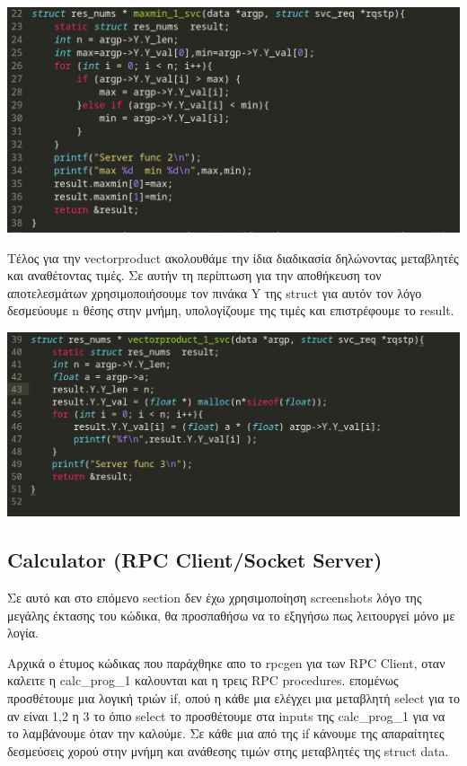 \begin{center}
			\includegraphics[width=1\textwidth]{image/maxmin.png}		
\end{center}
\noindent
Τέλος για την vectorproduct ακολουθάμε την ίδια διαδικασία  δηλώνοντας μεταβλητές και αναθέτοντας τιμές.
Σε αυτήν τη περίπτωση για την αποθήκευση τον αποτελεσμάτων χρησιμοποιήσουμε τον πινάκα Y της struct για αυτόν τον
λόγο δεσμεύουμε n θέσης στην μνήμη, υπολογίζουμε της τιμές και επιστρέφουμε το result.

\begin{center}
			\includegraphics[width=1\textwidth]{image/vector.png}		
\end{center}

\subsection{Calculator (RPC Client/Socket Server)}
\noindent
Σε αυτό και στο επόμενο section δεν έχω χρησιμοποίηση screenshots λόγο της μεγάλης έκτασης του κώδικα,
θα προσπαθήσω να το εξηγήσω πως λειτουργεί μόνο με λογία.

\noindent
Αρχικά ο έτυμος κώδικας που παράχθηκε απο το rpcgen για των RPC Client, οταν καλειτε η calc\_prog\_1 καλουνται 
και η τρεις RPC procedures. επομένως προσθέτουμε μια λογική τριών if, οπού η κάθε μια ελέγχει μια μεταβλητή select
για το αν είναι 1,2 η 3 το όπιο select το προσθέτουμε στα inputs της calc\_prog\_1 για να το λαμβάνουμε όταν την
καλούμε. Σε κάθε μια από της if κάνουμε της απαραίτητες δεσμεύσεις χορού στην μνήμη και ανάθεσης τιμών στης
μεταβλητές της struct data. 

